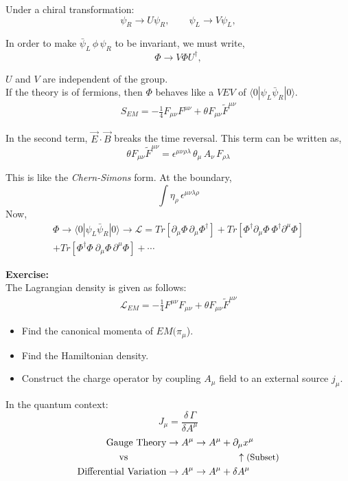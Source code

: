 \documentclass[14pt]{article} %
\begin{document}
Under a chiral transformation:
\[
\psi_R \to U \psi_R, \qquad \psi_L \to V \psi_L,
\]

In order to make $\bar\psi_L\,\phi\,\psi_R$ to be invariant, we must write,
\[
\Phi \to V \Phi U^\dagger,
\]

$U$ and $V$ are independent of the group.\\

If the theory is of fermions, then $\Phi$ behaves like a $VEV$ of $\langle 0|\psi_L \bar\psi_R|0\rangle$.
\begin{align*}
S_{EM} = -\frac14 F_{\mu \nu} F^{\mu \nu} + \theta F_{\mu \nu} \tilde{F}^{\mu \nu}
\end{align*}

In the second term, $\vec{E}\cdot\vec{B}$ breaks the time reversal. This term can be written as,
\[
\theta F_{\mu \nu} \tilde{F}^{\mu \nu} = \epsilon^{\mu \nu \rho \lambda}\, \theta_\mu \, A_{\nu}\, F_{\rho \lambda}
\]

This is like the \textit{Chern-Simons} form. At the boundary,
\[
\int \eta_\rho \,\epsilon^{\mu \nu \lambda \rho}
\]
Now,
\begin{align*}
\Phi \to \langle 0|\psi_L \bar\psi_R|0\rangle \to \mathscr{L} = Tr[\partial_\mu \Phi \,\partial_\mu \Phi^\dagger] + Tr[\Phi^\dagger \partial_\mu \Phi ~ \Phi^\dagger \partial^\mu \Phi] 
\\
+ Tr[\Phi^\dagger \Phi~ \partial_\mu \Phi \, \partial^\mu \Phi] + \cdots
\end{align*}
\begin{tcolorbox}
\textbf{Exercise:}\\
The Lagrangian density is given as follows:
\begin{align*}
    \mathcal{L}_{EM} = -\frac{1}{4} F^{\mu\nu} F_{\mu\nu} + \theta F_{\mu\nu} \tilde{F}^{\mu\nu}
\end{align*}
\begin{itemize}
    \item[a.] Find the canonical momenta of $EM(\pi_\mu$).
    \item[b.] Find the Hamiltonian density.
    \item[c.] Construct the charge operator by coupling $A_\mu$ field to an external source $j_\mu$. 
\end{itemize}
\end{tcolorbox}
In the quantum context:
\[
J_\mu = \frac{\delta\, \Gamma}{\delta A^\mu}
\]
\begin{align*}
\text{Gauge Theory} &\to A^\mu \to A^\mu + \partial_\mu x^\mu \\
\text{vs} \qquad \qquad & \qquad \qquad \qquad \quad \; \uparrow \small\text{(Subset)} \\
\text{Differential Variation} &\to A^\mu \to A^\mu + \delta A^\mu
\end{align*}
\end{document}
